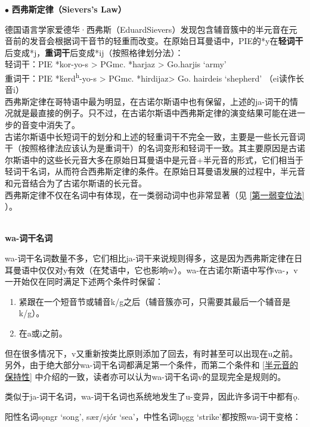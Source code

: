   \begin{info}
    $\bullet$ \textbf{西弗斯定律（Sievers's Law）}

    \indent
    德国语言学家爱德华·西弗斯（EduardSievers）发现包含辅音簇中的半元音在元音前的发音会根据词干音节的轻重而改变。在原始日耳曼语中，PIE的*y在\textbf{轻词干}后变成*j，\textbf{重词干}后变成*ij（按照格律划分法）：\\
    \indent
    轻词干：PIE *kor-yo-s \textgreater{} PGmc. *harjaz \textgreater{} Go.harjis `army'\\
    \indent
    重词干：PIE *ḱerd\textsuperscript{h}-yo-s \textgreater{} PGmc. *hirdijaz\textgreater{} Go. hairdeis `shepherd' （ei读作长音i）\\
    \indent
    西弗斯定律在哥特语中最为明显，在古诺尔斯语中也有保留，上述的ja-词干的情况就是最直接的例子。只不过，在古诺尔斯语中西弗斯定律的演变结果可能在进一步的音变中消失了。\\
    \indent
    古诺尔斯语中长短词干的划分和上述的轻重词干不完全一致，主要是一些长元音词干（按照格律法应该认为是重词干）的名词变形和轻词干一致。其主要原因是古诺尔斯语中的这些长元音大多在原始日耳曼语中是元音+半元音的形式，它们相当于轻词干名词，从而符合西弗斯定律的条件。在原始日耳曼语发展的过程中，半元音和元音结合为了古诺尔斯语的长元音。\\
    \indent
    西弗斯定律不仅在名词中有体现，在一类弱动词中也非常显著（见 \ref{第一弱变位法} ）。
\end{info}

~\\
\textbf{wa-词干名词}

wa-词干名词数量不多，它们相比ja-词干来说规则得多，这是因为西弗斯定律在日耳曼语中仅仅对y有效（在梵语中，它也影响w）。wa-在古诺尔斯语中写作va-，v一开始仅在同时满足下述两个条件时保留：

\begin{enumerate}[1)]
  \item
        紧跟在一个短音节或辅音k/g之后（辅音簇亦可，只需要其最后一个辅音是k/g）。
  \item
        在a或i之前。
\end{enumerate}

但在很多情况下，v又重新按类比原则添加了回去，有时甚至可以出现在u之前。另外，由于绝大部分wa-词干名词都满足第一个条件，而第二个条件和 \ref{半元音的保持性} 中介绍的一致，读者亦可以认为wa-词干名词v的显现完全是规则的。

类似于ja-词干名词，wa-词干名词也系统地发生了u-变异，因此许多词干中都有ǫ.

阳性名词sǫngr `song', sær/sjór `sea'，中性名词hǫgg
`strike'都按照wa-词干变格：

